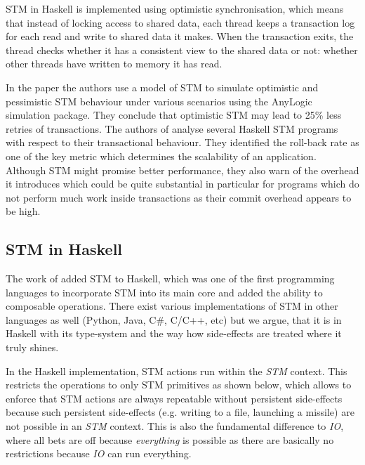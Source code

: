 STM in Haskell is implemented using optimistic synchronisation, which means that instead of locking access to shared data, each thread keeps a transaction log for each read and write to shared data it makes. When the transaction exits, the thread checks whether it has a consistent view to the shared data or not: whether other threads have written to memory it has read. %

In the paper \cite{heindl_modeling_2009} the authors use a model of STM to simulate optimistic and pessimistic STM behaviour under various scenarios using the AnyLogic simulation package. They conclude that optimistic STM may lead to 25\% less retries of transactions. The authors of \cite{perfumo_limits_2008} analyse several Haskell STM programs with respect to their transactional behaviour. They identified the roll-back rate as one of the key metric which determines the scalability of an application. Although STM might promise better performance, they also warn of the overhead it introduces which could be quite substantial in particular for programs which do not perform much work inside transactions as their commit overhead appears to be high.

\subsection{STM in Haskell}
The work of \cite{harris_composable_2005, harris_transactional_2006} added STM to Haskell, which was one of the first programming languages to incorporate STM into its main core and added the ability to composable operations. There exist various implementations of STM in other languages as well (Python, Java, C\#, C/C++, etc) but we argue, that it is in Haskell with its type-system and the way how side-effects are treated where it truly shines.

In the Haskell implementation, STM actions run within the \textit{STM} context. This restricts the operations to only STM primitives as shown below, which allows to enforce that STM actions are always repeatable without persistent side-effects because such persistent side-effects (e.g. writing to a file, launching a missile) are not possible in an \textit{STM} context. This is also the fundamental difference to  \textit{IO}, where all bets are off because \textit{everything} is possible as there are basically no restrictions because \textit{IO} can run everything.

